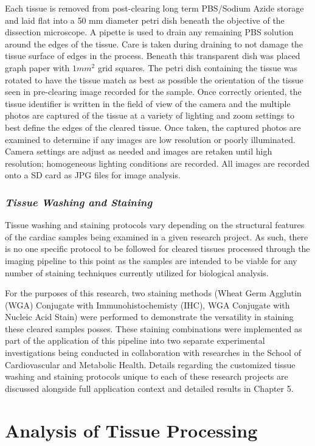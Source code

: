 Each tissue is removed from post-clearing long term PBS/Sodium Azide storage and laid flat into a 50 mm diameter petri dish beneath the objective of the dissection microscope. A pipette is used to drain any remaining PBS solution around the edges of the tissue. Care is taken during draining to not damage the tissue surface of edges in the process. 
Beneath this transparent dish was placed graph paper with \(1mm^2\) grid squares. The petri dish containing the tissue was rotated to have the tissue match as best as possible the orientation of the tissue seen in pre-clearing image recorded for the sample. Once correctly oriented, the tissue identifier is written in the field of view of the camera and the multiple photos are captured of the tissue at a variety of lighting and zoom settings to best define the edges of the cleared tissue. Once taken, the captured photos are examined to determine if any images are low resolution or poorly illuminated. Camera settings are adjust as needed and images are retaken until high resolution; homogeneous lighting conditions are recorded. All images are recorded onto a SD card as JPG files for image analysis.

\subsubsection{\textit{Tissue Washing and Staining}}
Tissue washing and staining protocols vary depending on the structural features of the cardiac samples being examined in a given research project. As such, there is no one specific protocol to be followed for cleared tissues processed through the imaging pipeline to this point as the samples are intended to be viable for any number of staining techniques currently utilized for biological analysis.

For the purposes of this research, two staining methods (Wheat Germ Agglutin (WGA) Conjugate with Immunohistochemisty (IHC), WGA Conjugate with Nucleic Acid Stain) were performed to demonstrate the versatility in staining these cleared samples posses. These staining combinations were implemented as part of the application of this pipeline into two separate experimental investigations being conducted in collaboration with researches in the School of Cardiovascular and Metabolic Health. Details regarding the customized tissue washing and staining protocols unique to each of these research projects are discussed alongside full application context and detailed results in Chapter 5.


\section{Analysis of Tissue Processing}
